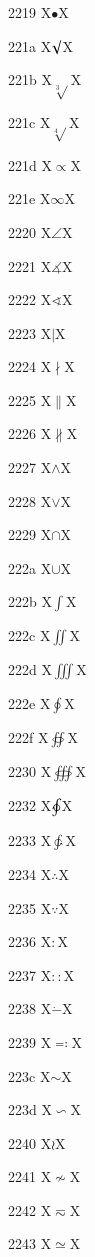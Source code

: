 \documentclass[11pt]{article}
\begin{document}
2219 X{\ensuremath{\bullet}}X

221a X{\ensuremath{\surd}}X

221b X{\ensuremath{\sqrt[3]{}}}X

221c X{\ensuremath{\sqrt[4]{}}}X

221d X{\ensuremath{\propto}}X

221e X{\ensuremath{\infty}}X

2220 X{\ensuremath{\angle}}X

2221 X{\ensuremath{\measuredangle}}X

2222 X{\ensuremath{\sphericalangle}}X

2223 X{\ensuremath{\mid}}X

2224 X{\ensuremath{\nmid}}X

2225 X{\ensuremath{\parallel}}X

2226 X{\ensuremath{\nparallel}}X

2227 X{\ensuremath{\wedge}}X

2228 X{\ensuremath{\vee}}X

2229 X{\ensuremath{\cap}}X

222a X{\ensuremath{\cup}}X

222b X{\ensuremath{\int}}X

222c X{\ensuremath{\iint}}X

222d X{\ensuremath{\iiint}}X

222e X{\ensuremath{\oint}}X

222f X{\ensuremath{\oiint}}X

2230 X{\ensuremath{\oiiint}}X

2232 X{\ensuremath{\ointclockwise}}X

2233 X{\ensuremath{\ointctrclockwise}}X

2234 X{\ensuremath{\therefore}}X

2235 X{\ensuremath{\because}}X

2236 X{\ensuremath{\mathrel{:}}}X

2237 X{\ensuremath{\mathrel{::}}}X

2238 X{\ensuremath{\dot{-}}}X

2239 X{\ensuremath{\eqcolon}}X

223c X{\ensuremath{\sim}}X

223d X{\ensuremath{\backsim}}X

2240 X{\ensuremath{\wr}}X

2241 X{\ensuremath{\nsim}}X

2242 X{\ensuremath{\eqsim}}X

2243 X{\ensuremath{\simeq}}X
\end{document}
